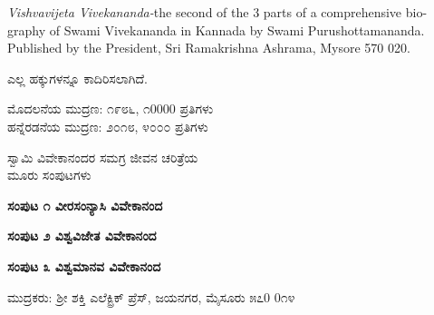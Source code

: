 \thispagestyle{empty}

\textit{Vishvavijeta Vivekananda-}the second of the 3 parts of a comprehensive bio- graphy of Swami Vivekananda in Kannada by Swami Purushottamananda. Published by the President, Sri Ramakrishna Ashrama, Mysore 570 020.

\begin{center}
ಎಲ್ಲ ಹಕ್ಕುಗಳನ್ನೂ ಕಾದಿರಿಸಲಾಗಿದೆ.
\end{center}

\begin{center}
ಮೊದಲನೆಯ ಮುದ್ರಣ: ೧೯೮೬, ೧0000 ಪ್ರತಿಗಳು\\ಹನ್ನೆರಡನೆಯ ಮುದ್ರಣ: ೨೦೧೮, ೪೦೦೦ ಪ್ರತಿಗಳು
\end{center}

\begin{center}
ಸ್ವಾಮಿ ವಿವೇಕಾನಂದರ ಸಮಗ್ರ ಜೀವನ ಚರಿತ್ರೆಯ\\ಮೂರು ಸಂಪುಟಗಳು
\end{center}

\begin{center}
\textbf{ಸಂಪುಟ ೧ ವೀರಸಂನ್ಯಾಸಿ ವಿವೇಕಾನಂದ}
\end{center}

\begin{center}
\textbf{ಸಂಪುಟ ೨ ವಿಶ್ವವಿಜೇತ ವಿವೇಕಾನಂದ}
\end{center}

\begin{center}
\textbf{ಸಂಪುಟ ೩ ವಿಶ್ವಮಾನವ ವಿವೇಕಾನಂದ}
\end{center}

\begin{center}
ಮುದ್ರಕರು: ಶ್ರೀ ಶಕ್ತಿ ಎಲೆಕ್ಟ್ರಿಕ್ ಪ್ರೆಸ್, ಜಯನಗರ, ಮೈಸೂರು ೫೭0 0೧೪
\end{center}

